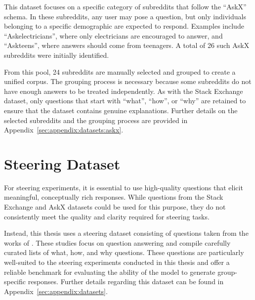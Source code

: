 This dataset focuses on a specific category of subreddits that follow the \enquote{AskX} schema. In these subreddits, any user may pose a question, but only individuals belonging to a specific demographic are expected to respond. Examples include \enquote{Askelectricians}, where only electricians are encouraged to answer, and \enquote{Askteens}, where answers should come from teenagers. A total of \num{26} such AskX subreddits were initially identified.

From this pool, \num{24} subreddits are manually selected and grouped to create a unified corpus. The grouping process is necessary because some subreddits do not have enough answers to be treated independently. As with the Stack Exchange dataset, only questions that start with \enquote{what}, \enquote{how}, or \enquote{why} are retained to ensure that the dataset contains genuine explanations. Further details on the selected subreddits and the grouping process are provided in Appendix~\ref{sec:appendix:datasets:askx}.

\section{Steering Dataset}%
\label{sec:datasets:steering}
For steering experiments, it is essential to use high-quality questions that elicit meaningful, conceptually rich responses. While questions from the Stack Exchange and AskX datasets could be used for this purpose, they do not consistently meet the quality and clarity required for steering tasks.

Instead, this thesis uses a steering dataset consisting of questions taken from the works of \citet{petroni-etal-2021-kilt,rooeinKnowYourAudience2023}. These studies focus on question answering and compile carefully curated lists of what, how, and why questions. These questions are particularly well-suited to the steering experiments conducted in this thesis and offer a reliable benchmark for evaluating the ability of the model to generate group-specific responses. Further details regarding this dataset can be found in Appendix~\ref{sec:appendix:datasets}.
